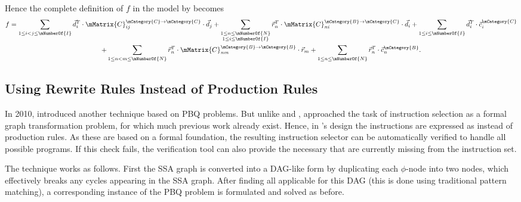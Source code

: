 Hence the complete definition of $f$ in the  model by
\citeauthor{Ebner2008} becomes
\begin{gather*}
  f =
  \sum_{1 \leq i < j \leq \mNumberOf{I}} \mVector{d}_i^T \cdot
    \mMatrix{C}_{ij}^{\mCategory{C} \rightarrow \mCategory{C}} \cdot \mVector{d}_j
  +
  \sum_{\substack{1 \leq n \leq \mNumberOf{N}\\1 \leq i \leq \mNumberOf{I}}}
    \mVector{r}_n^T \cdot
    \mMatrix{C}_{ni}^{\mCategory{B} \rightarrow \mCategory{C}} \cdot \mVector{d}_i
  +
  \sum_{1 \leq i \leq \mNumberOf{I}} \mVector{d}_i^T \cdot
    \mVector{c}_i^{\mCategory{C}}\\
  +
  \sum_{1 \leq n < m \leq \mNumberOf{N}} \mVector{r}_n^T \cdot
     \mMatrix{C}_{nm}^{\mCategory{B} \rightarrow \mCategory{B}} \cdot \mVector{r}_m
  +
  \sum_{1 \leq n \leq \mNumberOf{N}} \mVector{r}_n^T \cdot
     \mVector{c}_n^{\mCategory{B}}.
\end{gather*}


\subsection{Using Rewrite Rules Instead of Production Rules}

In 2010, \textcite{Buchwald2010} introduced another technique based on
\glspl{PBQ problem}.
%
But unlike \citeauthor{Eckstein2003} and
\citeauthor{Ebner2008}, \citeauthor{Buchwald2010} approached the task of
\gls{instruction selection} as a formal \gls{graph} transformation problem, for
which much previous work already exist.
%
Hence, in \citeauthor{Buchwald2010}'s
design the \glspl{instruction} are expressed as \trewriteRules instead of
\glspl{production rule}.
%
 As these \trewriteRules are based on a formal
foundation, the resulting \gls{instruction selector} can be automatically
verified to handle all possible \glspl{program}.
%
If this check fails, the
verification tool can also provide the necessary \trewriteRules that are
currently missing from the \gls{instruction set}.

The technique works as follows.
%
First the \gls{SSA graph} is converted into a
\gls{DAG}-like form by duplicating each \mbox{$\phi$-\gls{node}} into two
\glspl{node}, which effectively breaks any \glspl{cycle} appearing in the
\gls{SSA graph}.
%
After finding all applicable \trewriteRules for this \gls{DAG}
(this is done using traditional \gls{pattern matching}), a corresponding
instance of the \gls{PBQ problem} is formulated and solved as before.

